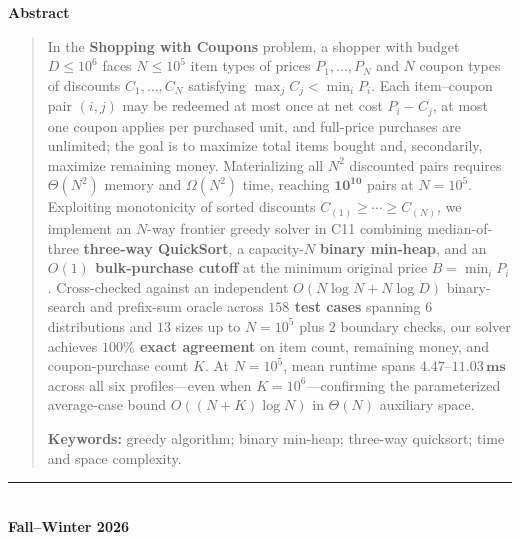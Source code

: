 \documentclass[10pt, a4paper]{article}
\begin{document}
\begin{titlepage}
\vspace{0.55cm}
\begin{center}
    {\large\bfseries\color{primary} Abstract}
\end{center}
\vspace{-0.25em}
\begin{quote}
\small\noindent
In the \textbf{Shopping with Coupons} problem, a shopper with budget $D \le 10^6$ faces $N \le 10^5$ item types of prices $P_1, \ldots, P_N$ and $N$ coupon types of discounts $C_1, \ldots, C_N$ satisfying $\max_j C_j < \min_i P_i$. Each item--coupon pair $(i, j)$ may be redeemed at most once at net cost $P_i - C_j$, at most one coupon applies per purchased unit, and full-price purchases are unlimited; the goal is to maximize total items bought and, secondarily, maximize remaining money. Materializing all $N^2$ discounted pairs requires $\Theta(N^2)$ memory and $\Omega(N^2)$ time, reaching $\mathbf{10^{10}}$ pairs at $N = 10^5$. Exploiting monotonicity of sorted discounts $C_{(1)} \ge \cdots \ge C_{(N)}$, we implement an $N$-way frontier greedy solver in C11 combining median-of-three \textbf{three-way QuickSort}, a capacity-$N$ \textbf{binary min-heap}, and an \textbf{$O(1)$ bulk-purchase cutoff} at the minimum original price $B = \min_i P_i$. Cross-checked against an independent $O(N \log N + N \log D)$ binary-search and prefix-sum oracle across \textbf{$158$ test cases} spanning $6$ distributions and $13$ sizes up to $N = 10^5$ plus $2$ boundary checks, our solver achieves \textbf{$100\%$ exact agreement} on item count, remaining money, and coupon-purchase count $K$. At $N = 10^5$, mean runtime spans \textbf{$\mathbf{4.47\text{--}11.03\,\text{ms}}$} across all six profiles---even when $K = 10^6$---confirming the parameterized average-case bound $O((N + K)\log N)$ in $\Theta(N)$ auxiliary space.

\vspace{0.5em}\noindent
{\color{primary}\textbf{Keywords:}} greedy algorithm; binary min-heap; three-way quicksort; time and space complexity.
\end{quote}

\vfill
\begin{center}
    {\color{accent!80}\rule{0.14\textwidth}{0.8pt}}\\[0.25cm]
    {\normalsize\bfseries\color{primary} Fall--Winter 2026}
\end{center}
\end{titlepage}

\thispagestyle{plain}
\vspace*{0.3cm}
\tableofcontents
\clearpage
\end{document}

